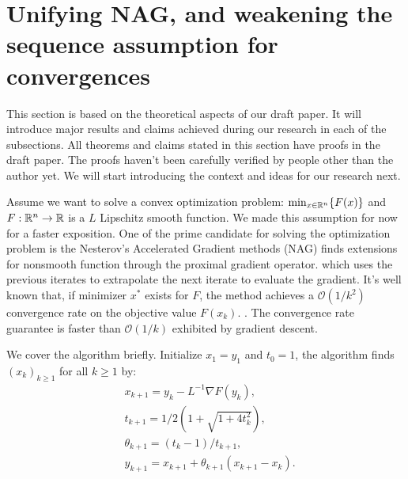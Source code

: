 \documentclass[12pt]{article}
\begin{document}
        

\section{Unifying NAG, and weakening the sequence assumption for convergences}\label{sec:unify-nes-acceleration}
    This section is based on the theoretical aspects of our draft paper. 
    It will introduce major results and claims achieved during our research in each of the subsections. 
    All theorems and claims stated in this section have proofs in the draft paper. 
    The proofs haven't been carefully verified by people other than the author yet. 
    We will start introducing the context and ideas for our research next. 
    \par
    Assume we want to solve a convex optimization problem: $\min_{x \in \mathbb R^n} \{F(x)\}$ and $F: \mathbb R^n \rightarrow \mathbb R$ is a $L$ Lipschitz smooth function. 
    We made this assumption for now for a faster exposition. 
    One of the prime candidate for solving the optimization problem is the Nesterov's Accelerated Gradient methods (NAG) finds extensions for nonsmooth function through the proximal gradient operator.
     which uses the previous iterates to extrapolate the next iterate to evaluate the gradient. 
    It's well known that, if minimizer $x^*$ exists for $F$, the method achieves a $\mathcal O(1/k^2)$ convergence rate on the objective value $F(x_k)$. 
    . 
    The convergence rate guarantee is faster than $\mathcal O(1/k)$ exhibited by gradient descent. 
    \par
    We cover the algorithm briefly. 
    Initialize $x_1 = y_1$ and $t_0 = 1$, the algorithm finds $(x_k)_{k \ge 1}$ for all $k \ge 1$ by: 
    \begin{align}\label{eqn:nag_example}
        & x_{k + 1} = y_k - L^{-1}\nabla F(y_k), 
        \\
        & t_{k + 1} = 1/2\left(1 + \sqrt{1 + 4t_{k}^2}\right), 
        \\
        & \theta_{k + 1} = (t_{k} - 1)/t_{k + 1}, 
        \\
        & y_{k + 1} = x_{k + 1} + \theta_{k + 1}(x_{k + 1} - x_k). 
    \end{align}
\end{document}
